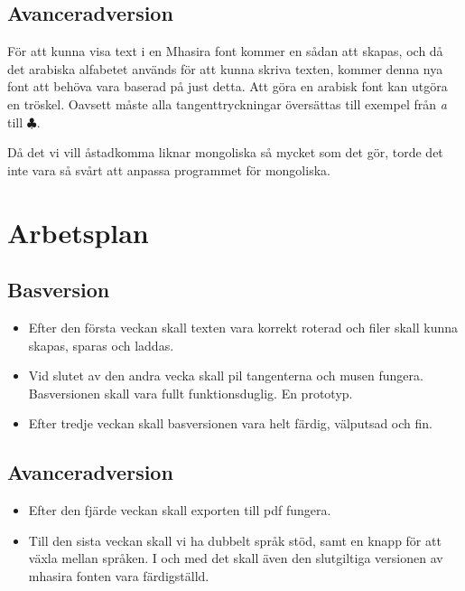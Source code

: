 \documentclass[a4paper,11p,twoside]{report}
\begin{document}
\subsection{Avanceradversion}
För att kunna visa text i en Mhasira font kommer en sådan att skapas, och då det arabiska alfabetet används för att kunna skriva texten, kommer denna nya font att behöva vara baserad på just detta. Att göra en arabisk font kan utgöra en tröskel. Oavsett måste alla tangenttryckningar översättas till exempel från \emph{a} till \emph{$\clubsuit$}. 

Då det vi vill åstadkomma liknar mongoliska så mycket som det gör, torde det inte vara så svårt att anpassa programmet för mongoliska.

\section{Arbetsplan}
\subsection{Basversion}
\begin{itemize}
	\item Efter den första veckan skall texten vara korrekt roterad och filer skall kunna skapas, sparas och laddas.
	\item Vid slutet av den andra vecka skall pil tangenterna och musen fungera. Basversionen skall vara fullt funktionsduglig. En prototyp.
	\item Efter tredje veckan skall basversionen vara helt färdig, välputsad och fin.
\end{itemize}

\subsection{Avanceradversion}
\begin{itemize}
	\item Efter den fjärde veckan skall exporten till pdf fungera.
	\item Till den sista veckan skall vi ha dubbelt språk stöd, samt en knapp för att växla mellan språken. I och med det skall även den slutgiltiga versionen av mhasira fonten vara färdigställd.
\end{itemize}
\end{document}
